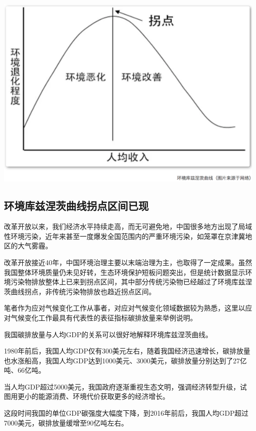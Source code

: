 \documentclass[]{book}
\begin{document}
\includegraphics[width=8.33in]{images/huanjing1}

\hypertarget{ux73afux5883ux5e93ux5179ux6d85ux8328ux66f2ux7ebfux62d0ux70b9ux533aux95f4ux5df2ux73b0}{%
\subsection{环境库兹涅茨曲线拐点区间已现}\label{ux73afux5883ux5e93ux5179ux6d85ux8328ux66f2ux7ebfux62d0ux70b9ux533aux95f4ux5df2ux73b0}}

改革开放以来，我们经济水平持续走高，而无可避免地，中国很多地方出现了局域性环境污染，近年来甚至一度爆发全国范围内的严重环境污染，如笼罩在京津冀地区的大气雾霾。

改革开放接近40年，中国环境治理主要以末端治理为主，也取得了一定成果。虽然我国整体环境质量仍未见好转，生态环境保护短板问题突出，但是统计数据显示环境污染物排放整体上已来到拐点区间，其中部分传统污染物已经越过了环境库兹涅茨曲线拐点，非传统污染物排放也趋近拐点区间。

笔者作为应对气候变化工作从事者，对应对气候变化领域数据较为熟悉，这里以应对气候变化工作最具有代表性的表征指标碳排放量来举例说明。

我国碳排放量与人均GDP的关系可以很好地解释环境库兹涅茨曲线。

1980年前后，我国人均GDP仅有300美元左右，随着我国经济迅速增长，碳排放量也水涨船高，我国人均GDP达到1000美元、3000美元，碳排放量分别达到了27亿吨、66亿吨。

当人均GDP超过5000美元，我国政府逐渐重视生态文明，强调经济转型升级，试图用更小的能源消费、环境代价获取更多的经济增长。

这段时间我国的单位GDP碳强度大幅度下降，到2016年前后，我国人均GDP超过7000美元，碳排放量缓增至90亿吨左右。
\end{document}
